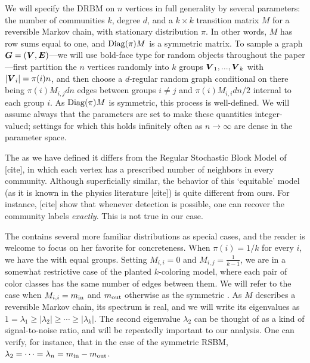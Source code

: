 We will specify the DRBM on $n$ vertices in full generality by several parameters: the number of communities $k$, degree $d$, and a $k\times k$ transition matrix $M$ for a reversible Markov chain, with stationary distribution $\pi$. In other words, $M$ has row sums equal to one, and $\operatorname{Diag}(\pi) M$ is a symmetric matrix. To sample a graph $\boldsymbol{G} = (\boldsymbol{V}, \boldsymbol{E})$---we will use bold-face type for random objects throughout the paper---first partition the $n$ vertices randomly into $k$ groups $\boldsymbol{V}_1,...,\boldsymbol{V}_k$ with $|\boldsymbol{V}_i| = \pi(i)n$, and then choose a $d$-regular random graph conditional on there being $\pi(i)M_{i,j} d n$ edges between groups $i\neq j$ and $\pi(i)M_{i,i} dn/2$ internal to each group $i$. As $\operatorname{Diag}(\pi) M$ is symmetric, this process is well-defined. We will assume always that the parameters are set to make these quantities integer-valued; settings for which this holds infinitely often as $n\to\infty$ are dense in the parameter space. 

\begin{remark}
	The \model as we have defined it differs from the Regular Stochastic Block Model of [cite], in which each vertex has a prescribed number of neighbors in every community. Although superficially similar, the behavior of this `equitable' model (as it is known in the physics literature [cite]) is quite different from ours. For instance, [cite] show that whenever detection is possible, one can recover the community labels \emph{exactly}. This is not true in our case. 
\end{remark}

The \model contains several more familiar distributions as special cases, and the reader is welcome to focus on her favorite for concreteness. When $\pi(i) = 1/k$ for every $i$, we have the \model with equal groups. Setting $M_{i,i} = 0$ and $M_{i,j} = \tfrac{1}{k-1}$, we are in a somewhat restrictive case of the planted $k$-coloring model, where each pair of color classes has the same number of edges between them. We will refer to the case when $M_{i,i} = m_{\textup{in}}$ and $m_{\textup{out}}$ otherwise as the symmetric \model. As $M$ describes a reversible Markov chain, its spectrum is real, and we will write its eigenvalues as $1 = \lambda_1 \ge |\lambda_2| \ge \cdots \ge |\lambda_k|$. The second eigenvalue $\lambda_2$ can be thought of as a kind of signal-to-noise ratio, and will be repeatedly important to our analysis. One can verify, for instance, that in the case of the symmetric RSBM, $\lambda_2 = \cdots = \lambda_n = m_{\textup{in}} - m_{\textup{out}}$.

